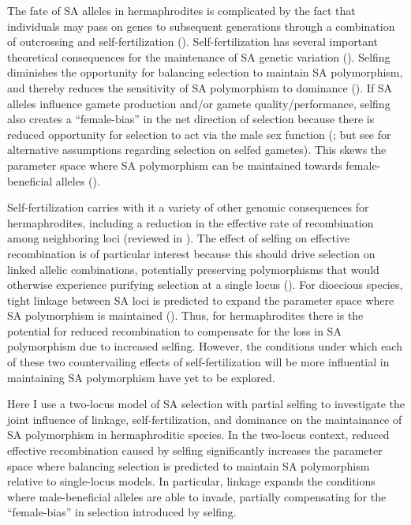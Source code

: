 \documentclass{article}
\begin{document}
The fate of SA alleles in hermaphrodites is complicated by the fact that individuals may pass on genes to subsequent generations through a combination of outcrossing and self-fertilization (\citealt{Goodwillie2005, JarneAuld2006, Igic2005, JordanConn2014}). Self-fertilization has several important theoretical consequences for the maintenance of SA genetic variation (\citealt{JordanConn2014, KimuraOhta1971}). Selfing diminishes the opportunity for balancing selection to maintain SA polymorphism, and thereby reduces the sensitivity of SA polymorphism to dominance (\citealt{JordanConn2014, Tazzyman2015}). If SA alleles influence gamete production and/or gamete quality/performance, selfing also creates a ``female-bias'' in the net direction of selection because there is reduced opportunity for selection to act via the male sex function (\citealt{Charlesworth1978, JordanConn2014}; but see \citealt{Tazzyman2015} for alternative assumptions regarding selection on selfed gametes). This skews the parameter space where SA polymorphism can be maintained towards female-beneficial alleles (\citealt{JordanConn2014}). 

Self-fertilization carries with it a variety of other genomic consequences for hermaphrodites, including a reduction in the effective rate of recombination among neighboring loci (reviewed in \citealt{Wright2008}). The effect of selfing on effective recombination is of particular interest because this should drive selection on linked allelic combinations, potentially preserving polymorphisms that would otherwise experience purifying selection at a single locus (\citealt{Fisher1930}). For dioecious species, tight linkage between SA loci is predicted to expand the parameter space where SA polymorphism is maintained (\citealt{Patten2010}). Thus, for hermaphrodites there is the potential for reduced recombination to compensate for the loss in SA polymorphism due to increased selfing. However, the conditions under which each of these two countervailing effects of self-fertilization will be more influential in maintaining SA polymorphism have yet to be explored. 

Here I use a two-locus model of SA selection with partial selfing to investigate the joint influence of linkage, self-fertilization, and dominance on the maintainance of SA polymorphism in hermaphroditic species. In the two-locus context, reduced effective recombination caused by selfing significantly increases the parameter space where balancing selection is predicted to maintain SA polymorphism relative to single-locus models. In particular, linkage expands the conditions where male-beneficial alleles are able to invade, partially compensating for the ``female-bias'' in selection introduced by selfing.
\end{document}
